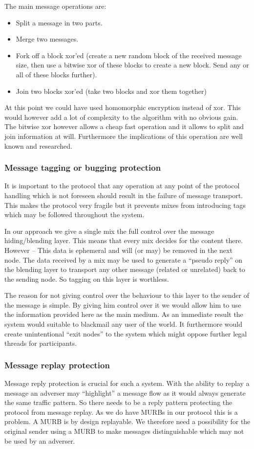 The main message operations are:
\begin{itemize}
	\item Split a message in two parts.
	\item Merge two messages.
	\item Fork off a block xor'ed (create a new random block of the received message size, then use a bitwise xor of these blocks to create a new block. Send any or all of these blocks further).
	\item Join two blocks xor'ed (take two blocks and xor them together)
\end{itemize}

At this point we could have used homomorphic encryption instead of xor. This would however add a lot of complexity to the algorithm with no obvious gain. The bitwise xor however allows a cheap fast operation and it allows to split and join information at will. Furthermore the implications of this operation are well known and researched.

\subsubsection{Message tagging or bugging protection}
It is important to the protocol that any operation at any point of the protocol handling which is not foreseen should result in the failure of message transport. This makes the protocol very fragile but it prevents mixes from introducing tags which may be followed throughout the system.

In our approach we give a single mix the full control over the message hiding/blending layer. This means that every mix decides for the content there. However -- This data is ephemeral and will (or may) be removed in the next node. The data received by a mix may be used to generate a ``pseudo reply'' on the blending layer to transport any other message (related or unrelated) back to the sending node. So tagging on this layer is worthless.

The reason for not giving control over the behaviour to this layer to the sender of the message is simple. By giving him control over it we would allow him to use the information provided here as the main medium. As an immediate result the system would suitable to blackmail any user of the world. It furthermore would create unintentional ``exit nodes'' to the system which might oppose further legal threads for participants.

\subsubsection{Message replay protection}
Message reply protection is crucial for such a system. With the ability to replay a message an adverser may ``highlight'' a message flow as it would always generate the same traffic pattern. So there needs to be a reply pattern protecting the protocol from message replay. As we do have MURBs in our protocol this is a problem. A MURB is by design replayable. We therefore need a possibility for the original sender using a MURB to make messages distinguishable which may not be used by an adverser.

